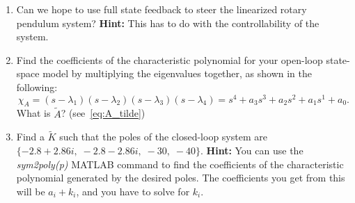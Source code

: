 \begin{enumerate}
\begin{enumerate}
              \item Can we hope to use full state feedback to steer the linearized rotary pendulum system? \textbf{Hint:} This has to do with the controllability of the system.
              \item Find the coefficients of the characteristic polynomial for your open-loop state-space model by multiplying the eigenvalues together, as shown in the following:
                    \[
                        \chi_{A} = (s-\lambda_1)(s-\lambda_2)(s-\lambda_3)(s-\lambda_4) = s^4 + a_3 s^3 + a_2 s^2 + a_1 s^1 + a_0.
                    \]
                    What is $\tilde{A}$? (see~\eqref{eq:A_tilde})
              \item Find a $\tilde{K}$ such that the poles of the closed-loop system are $\{-2.8 + 2.86i, \; -2.8 - 2.86i, \; -30, \; -40\}$.
                    \textbf{Hint:} You can use the \emph{sym2poly(p)} MATLAB command to find the coefficients of the characteristic polynomial generated by the desired poles. The coefficients you get from this will be \( a_i + k_i \), and you have to solve for \( k_i \).

\end{enumerate}
\end{enumerate}
